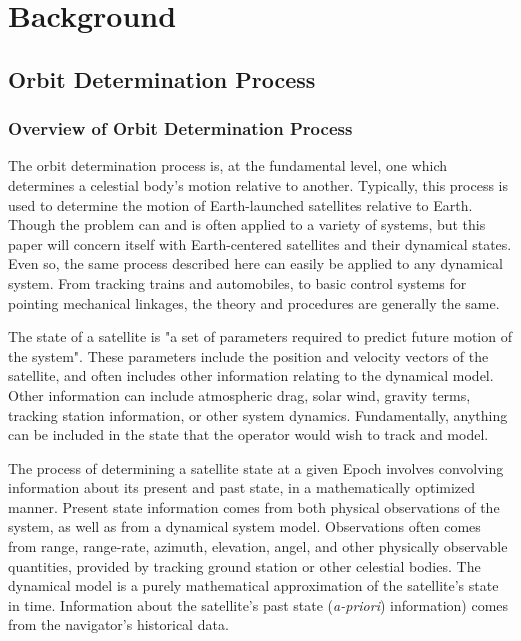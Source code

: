 \documentclass[12pt,a4paper,oneside]{article}
\numberwithin{equation}{section}   		%
\begin{document}
\newpage
\section{Background}
\label{sec:Background}

\subsection{Orbit Determination Process}
\label{sec:OD Process}


\subsubsection{Overview of Orbit Determination Process}
\label{sec:OD sub Overview}
The orbit determination process is, at the fundamental level, one which determines a celestial body's motion relative to another. Typically, this process is used to determine the motion of Earth-launched satellites relative to Earth. Though the problem can and is often applied to a variety of systems, but this paper will concern itself with Earth-centered satellites and their dynamical states. Even so, the same process described here can easily be applied to any dynamical system. From tracking trains and automobiles, to basic control systems for pointing mechanical linkages, the theory and procedures are generally the same. 

The state of a satellite is "a set of parameters required to predict future motion of the system"\cite{tapley2004statistical}. These parameters include the position and velocity vectors of the satellite, and often includes other information relating to the dynamical model. Other information can include atmospheric drag, solar wind, gravity terms, tracking station information, or other system dynamics. Fundamentally, anything can be included in the state that the operator would wish to track and model. 

The process of determining a satellite state at a given Epoch involves convolving information about its present and past state, in a mathematically optimized manner. Present state information comes from both physical observations of the system, as well as from a dynamical system model. Observations often comes from range, range-rate, azimuth, elevation, angel, and other physically observable quantities, provided by tracking ground station or other celestial bodies. The dynamical model is a purely mathematical approximation of the satellite's state in time. Information about the satellite's past state (\emph{a-priori}) information) comes from the navigator's historical data. 
\end{document}
